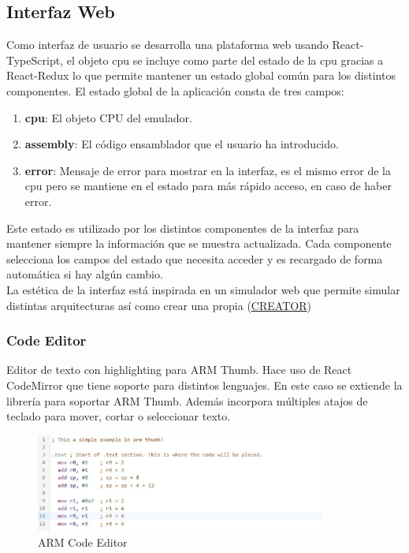    \subsection{Interfaz Web}
    {
        Como interfaz de usuario se desarrolla una plataforma web usando React-TypeScript,
        el objeto cpu se incluye como parte del estado de la cpu gracias a React-Redux lo que
        permite mantener un estado global común para los distintos componentes. El estado global
        de la aplicación consta de tres campos:

        \begin{enumerate}
            \item \textbf{cpu}: El objeto CPU del emulador.
            \item \textbf{assembly}: El código ensamblador que el usuario ha introducido.
            \item \textbf{error}: Mensaje de error para mostrar en la interfaz, es el mismo error de la cpu pero se mantiene en el estado para más rápido acceso, en caso de haber error.
        \end{enumerate}

        Este estado es utilizado por los distintos componentes de la interfaz para mantener siempre la información que se muestra actualizada.
        Cada componente selecciona los campos del estado que necesita acceder y es recargado
        de forma automática si hay algún cambio. \\

        La estética de la interfaz está inspirada en un simulador web que permite simular distintas arquitecturas
        así como crear una propia (\href{https://creatorsim.github.io/creator/}{CREATOR})
        
        \subsubsection{Code Editor}
        {
            Editor de texto con highlighting para ARM Thumb. Hace uso de React CodeMirror que tiene soporte para distintos lenguajes. En este caso se extiende la librería para soportar ARM Thumb. Además incorpora múltiples atajos de teclado para mover, cortar o seleccionar texto.
            
            \begin{figure}[h]
                \centering
                \includegraphics[width=0.85\textwidth]{images/editor}
                \caption{ARM Code Editor}
            \end{figure}

}}
